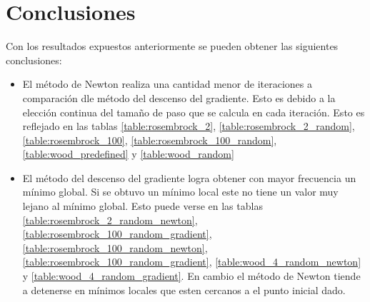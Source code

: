 \section{Conclusiones}

Con los resultados expuestos anteriormente se pueden obtener las siguientes conclusiones:

\begin{itemize}
    \item El método de Newton realiza una cantidad menor de iteraciones a comparación dle método del descenso del gradiente. Esto es debido a la elección continua del tamaño de paso que se calcula en cada iteración. Esto es reflejado en las tablas \ref{table:rosembrock_2}, \ref{table:rosembrock_2_random}, \ref{table:rosembrock_100}, \ref{table:rosembrock_100_random}, \ref{table:wood_predefined} y \ref{table:wood_random}
    \item El método del descenso del gradiente logra obtener con mayor frecuencia un mínimo global. Si se obtuvo un mínimo local este no tiene un valor muy lejano al mínimo global. Esto puede verse en las tablas \ref{table:rosembrock_2_random_newton}, \ref{table:rosembrock_100_random_gradient}, \ref{table:rosembrock_100_random_newton}, \ref{table:rosembrock_100_random_gradient}, \ref{table:wood_4_random_newton} y \ref{table:wood_4_random_gradient}. En cambio el método de Newton tiende a detenerse en mínimos locales que esten cercanos a el punto inicial dado.
\end{itemize}